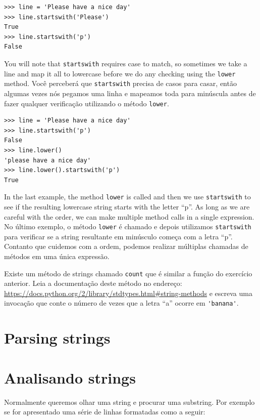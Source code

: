 {\beforeverb
\begin{verbatim}
>>> line = 'Please have a nice day'
>>> line.startswith('Please')
True
>>> line.startswith('p')
False
\end{verbatim}
\afterverb
%
You will note that {\tt startswith} requires case to match, so sometimes
we take a line and map it all to lowercase before we do any checking
using the {\tt lower} method.
%
Você perceberá que {\tt startswith} precisa de casos para casar, então algumas
vezes nós pegamos uma linha e mapeamos toda para minúscula antes de fazer
qualquer verificação utilizando o método {\tt lower}.

\beforeverb
\begin{verbatim}
>>> line = 'Please have a nice day'
>>> line.startswith('p')
False
>>> line.lower()
'please have a nice day'
>>> line.lower().startswith('p')
True
\end{verbatim}
\afterverb
%
In the last example, the method {\tt lower} is called
and then we use {\tt startswith}
to see if the resulting lowercase string
starts with the letter ``p''.  As long as we are careful
with the order, we can make multiple method calls in a
single expression.
%
No último exemplo, o método {\tt lower} é chamado e depois utilizamos
{\tt startswith} para verificar se a string resultante em minúsculo começa
com a letra ``p''. Contanto que cuidemos com a ordem, podemos realizar
múltiplas chamadas de métodos em uma única expressão.

\begin{ex}

Existe um método de strings chamado {\tt count} que é similar a função do
exercício anterior. Leia a documentação deste método no endereço:
\url{https://docs.python.org/2/library/stdtypes.html#string-methods}
e escreva uma invocação que conte o número de vezes que a letra ``a'' ocorre
em \verb"'banana'".
\end{ex}

\section{Parsing strings}
\section{Analisando strings}
Normalmente queremos olhar uma string e procurar uma substring. Por exemplo
se for apresentado uma série de linhas formatadas como a seguir:

}

